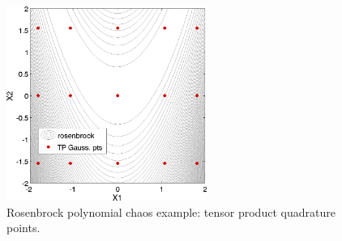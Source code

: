 \begin{figure}[htbp!]
  \centering
  \includegraphics[height=2.5in]{images/rosen_pce_pts}
  \caption{Rosenbrock polynomial chaos example: tensor product quadrature points.}
  \label{uq:examples:rosen_pce_points}
\end{figure}

